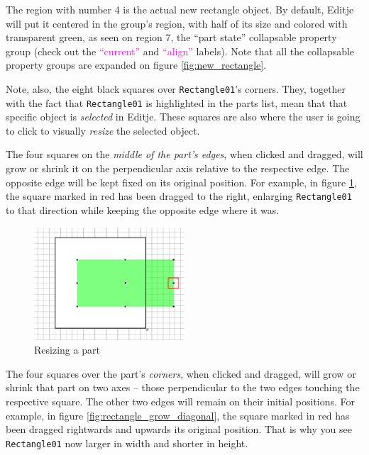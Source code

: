 \documentclass[a4paper]{profusion}
\newcommand{\GUILabel}[1]{\textcolor{magenta}{#1}}
\begin{document}
The region with number 4 is the actual new rectangle object. By
default, Editje will put it centered in the group's region, with half
of its size and colored with transparent green, as seen on region 7,
the ``part state'' collapsable property group (check out the
\GUILabel{``current''} and \GUILabel{``align''} labels). Note that all
the collapsable property groups are expanded on figure
\ref{fig:new_rectangle}.

Note, also, the eight black squares over \texttt{Rectangle01}'s
corners. They, together with the fact that \texttt{Rectangle01} is
highlighted in the parts list, mean that that specific object is
\emph{selected} in Editje. These squares are also where the user is
going to click to visually \emph{resize} the selected object.

The four squares on the \emph{middle of the part's edges}, when
clicked and dragged, will grow or shrink it on the perpendicular axis
relative to the respective edge. The opposite edge will be kept fixed
on its original position. For example, in figure
\ref{fig:rectangle_grow_left}, the square marked in red has been
dragged to the right, enlarging \texttt{Rectangle01} to that direction
while keeping the opposite edge where it was.

\begin{figure}[h!]
  \centering
  \includegraphics[width=0.5\textwidth]{images/rectangle_grow_left.png}
  \caption{Resizing a part}
  \label{fig:rectangle_grow_left}
\end{figure}

The four squares over the part's \emph{corners}, when clicked and
dragged, will grow or shrink that part on two axes -- those
perpendicular to the two edges touching the respective square. The
other two edges will remain on their initial positions. For example,
in figure \ref{fig:rectangle_grow_diagonal}, the square marked in red
has been dragged rightwards and upwards its original position. That is
why you see \texttt{Rectangle01} now larger in width and shorter in
height.
\end{document}
